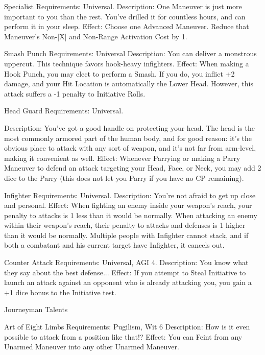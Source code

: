 \documentclass[oneside,11pt,english]{book}
\begin{document}
 

Specialist 
Requirements: Universal. 
Description: One Maneuver is just more important to you than the rest. You’ve drilled it for countless 
hours, and can perform it in your sleep. 
Effect: Choose one Advanced Maneuver. Reduce that Maneuver’s Non-[X] and Non-Range Activation 
Cost by 1. 

 

Smash Punch 
Requirements: Universal 
Description: You can deliver a monstrous uppercut. This technique favors hook-heavy infighters. 
Effect: When making a Hook Punch, you may elect to perform a Smash. If you do, you inflict +2 
damage, and your Hit Location is automatically the Lower Head. However, this attack suffers a -1 penalty 
to Initiative Rolls. 

 

Head Guard 
Requirements: Universal. 


Description: You’ve got a good handle on protecting your head. The head is the most commonly 
armored part of the human body, and for good reason: it’s the obvious place to attack with any sort of 
weapon, and it’s not far from arm-level, making it convenient as well. 
Effect: Whenever Parrying or making a Parry Maneuver to defend an attack targeting your Head, Face, or 
Neck, you may add 2 dice to the Parry (this does not let you Parry if you have no CP remaining). 

 

Infighter 
Requirements: Universal. 
Description: You’re not afraid to get up close and personal. 
Effect: When fighting an enemy inside your weapon's reach, your penalty to attacks is 1 less than it 
would be normally. When attacking an enemy within their weapon’s reach, their penalty to attacks and 
defenses is 1 higher than it would be normally. Multiple people with Infighter cannot stack, and if both a 
combatant and his current target have Infighter, it cancels out. 

 

Counter Attack 
Requirements: Universal, AGI 4. 
Description: You know what they say about the best defense... 
Effect: If you attempt to Steal Initiative to launch an attack against an opponent who is already attacking 
you, you gain a +1 dice bonus to the Initiative test. 

 

Journeyman Talents 

 

Art of Eight Limbs 
Requirements: Pugilism, Wit 6 
Description: How is it even possible to attack from a position like that!? 
Effect: You can Feint from any Unarmed Maneuver into any other Unarmed Maneuver. 
\end{document}
